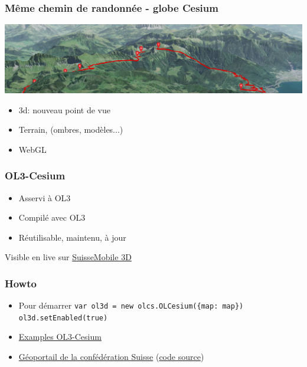 \documentclass[handout]{beamer}
\begin{document}
  \begin{frame}
    \frametitle{Même chemin de randonnée - globe Cesium}
	\begin{center}
	  \includegraphics[width=1.0 \linewidth]{./vtt_3d2_half.png}
	\end{center}
	\pause
	
    \begin{itemize}
      \item 3d: nouveau point de vue
      \item Terrain, (ombres, modèles...)
      \item WebGL
    \end{itemize}
  \end{frame}

  
  \begin{frame}
    \frametitle{OL3-Cesium}

    \begin{itemize}
      \item Asservi à OL3
      \item Compilé avec OL3
      \item Réutilisable, maintenu, à jour
    \end{itemize}

     \pause
     Visible en live sur \href{https://map.schweizmobil.ch/?cesium&trackId=2149217}{SuisseMobile 3D}
    
    \end{frame}

  
  \begin{frame}
    \frametitle{Howto}
    
    \begin{itemize}
      \item Pour démarrer \newline
	    \texttt{var ol3d = new olcs.OLCesium(\{map: map\})}\newline
	    \texttt{ol3d.setEnabled(true)}\newline
      \pause
      \item \href{http://openlayers.org/ol3-cesium/examples/}{Examples OL3-Cesium}
      \pause
      \item \href{https://map.geo.admin.ch/}{Géoportail de la confédération Suisse} (\href{https://github.com/geoadmin/mf-geoadmin3}{code source})
    \end{itemize}
  \end{frame}
\end{document}
